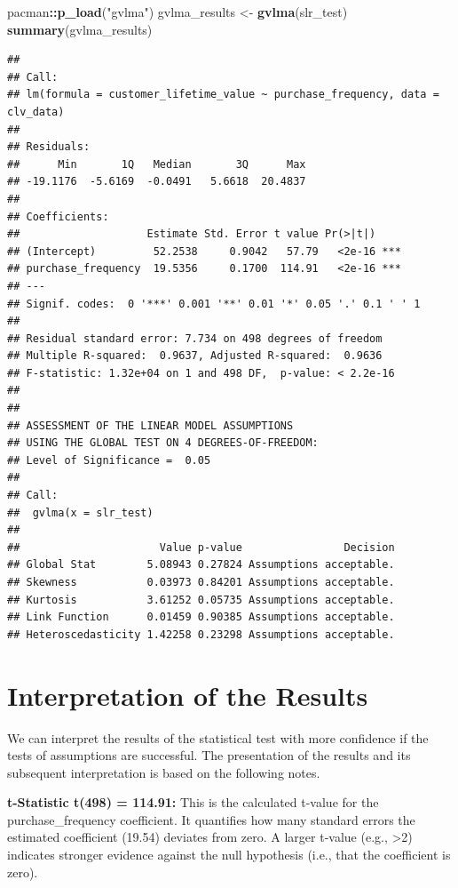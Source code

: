 \documentclass[
]{article}
\newenvironment{Shaded}{\begin{snugshade}}{\end{snugshade}}
\newcommand{\FunctionTok}[1]{\textcolor[rgb]{0.13,0.29,0.53}{\textbf{#1}}}
\newcommand{\NormalTok}[1]{#1}
\newcommand{\OtherTok}[1]{\textcolor[rgb]{0.56,0.35,0.01}{#1}}
\newcommand{\SpecialCharTok}[1]{\textcolor[rgb]{0.81,0.36,0.00}{\textbf{#1}}}
\newcommand{\StringTok}[1]{\textcolor[rgb]{0.31,0.60,0.02}{#1}}
\begin{document}
\begin{Shaded}
\begin{Highlighting}[]
\NormalTok{pacman}\SpecialCharTok{::}\FunctionTok{p\_load}\NormalTok{(}\StringTok{"gvlma"}\NormalTok{)}
\NormalTok{gvlma\_results }\OtherTok{\textless{}{-}} \FunctionTok{gvlma}\NormalTok{(slr\_test)}
\FunctionTok{summary}\NormalTok{(gvlma\_results)}
\end{Highlighting}
\end{Shaded}

\begin{verbatim}
## 
## Call:
## lm(formula = customer_lifetime_value ~ purchase_frequency, data = clv_data)
## 
## Residuals:
##      Min       1Q   Median       3Q      Max 
## -19.1176  -5.6169  -0.0491   5.6618  20.4837 
## 
## Coefficients:
##                    Estimate Std. Error t value Pr(>|t|)    
## (Intercept)         52.2538     0.9042   57.79   <2e-16 ***
## purchase_frequency  19.5356     0.1700  114.91   <2e-16 ***
## ---
## Signif. codes:  0 '***' 0.001 '**' 0.01 '*' 0.05 '.' 0.1 ' ' 1
## 
## Residual standard error: 7.734 on 498 degrees of freedom
## Multiple R-squared:  0.9637, Adjusted R-squared:  0.9636 
## F-statistic: 1.32e+04 on 1 and 498 DF,  p-value: < 2.2e-16
## 
## 
## ASSESSMENT OF THE LINEAR MODEL ASSUMPTIONS
## USING THE GLOBAL TEST ON 4 DEGREES-OF-FREEDOM:
## Level of Significance =  0.05 
## 
## Call:
##  gvlma(x = slr_test) 
## 
##                      Value p-value                Decision
## Global Stat        5.08943 0.27824 Assumptions acceptable.
## Skewness           0.03973 0.84201 Assumptions acceptable.
## Kurtosis           3.61252 0.05735 Assumptions acceptable.
## Link Function      0.01459 0.90385 Assumptions acceptable.
## Heteroscedasticity 1.42258 0.23298 Assumptions acceptable.
\end{verbatim}

\section{Interpretation of the
Results}\label{interpretation-of-the-results}

We can interpret the results of the statistical test with more
confidence if the tests of assumptions are successful. The presentation
of the results and its subsequent interpretation is based on the
following notes.

\textbf{t-Statistic t(498) = 114.91:} This is the calculated t-value for
the purchase\_frequency coefficient. It quantifies how many standard
errors the estimated coefficient (19.54) deviates from zero. A larger
t-value (e.g., \textgreater2) indicates stronger evidence against the
null hypothesis (i.e., that the coefficient is zero).
\end{document}

